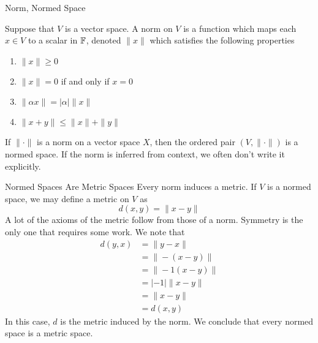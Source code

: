 \documentclass[10pt]{beamer}
\begin{document}
		\begin{frame}{Norm, Normed Space}
				\begin{definition}
						Suppose that $V$ is a vector space. A \alert{norm} on $V$ is a function which maps each $x\in V$ to a scalar in $\mathbb{F}$, denoted $\|x\|$ which satisfies the following properties
						\begin{enumerate}
								\item $\|x\| \geq 0$ 
								\item $\|x\| = 0$ if and only if $x = 0$ 
								\item $\|\alpha x\| = |\alpha| \|x\|$
								\item $\|x + y\| \leq \|x\| + \|y\|$
						\end{enumerate}
						If $\| \cdot \|$ is a norm on a vector space $X$, then the ordered pair $(V, \|\cdot\|)$ is a \alert{normed space}. If the norm is inferred from context, we often don't write it explicitly. 
				\end{definition}
		\end{frame}

		\begin{frame}{Normed Spaces Are Metric Spaces}
				Every norm induces a metric. If $V$ is a normed space, we may define a metric on $V$ as 
				\begin{equation*}
						d(x, y) = \|x - y\|
				\end{equation*}
				A lot of the axioms of the metric follow from those of a norm. Symmetry is the only one that requires some work. We note that 
				\begin{align*}
						d(y, x) &= \|y - x\| \\ 
										&= \|-(x - y)\| \\ 
										&= \|-1(x - y)\| \\ 
										&= |-1| \|x-y\| \\ 
										&= \|x - y\| \\ 
										&= d(x, y)
				\end{align*}
				In this case, $d$ is the \alert{metric induced by the norm}. We conclude that every normed space is a metric space. 
		\end{frame}
\end{document}

